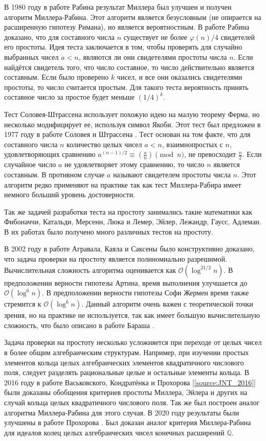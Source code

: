 \documentclass[_dissertation.tex]{subfiles}
\begin{document}
В 1980 году в работе Рабина \cite{Rabin} результат Миллера был улучшен и получен алгоритм Миллера-Рабина.
Этот алгоритм является безусловным (не опирается на расширенную гипотезу Римана), но является вероятностным.
В работе Рабина доказано, что для составного числа $n$ существует не более $\varphi(n)/4$ свидетелей его простоты.
Идея теста заключается в том, чтобы проверять для случайно выбранных чисел $a < n$, являются ли они свидетелями простоты числа $n$.
Если найдётся свидетель того, что число составное, то число действительно является составным.
Если было проверено $k$ чисел, и все они оказались свидетелями простоты, то число считается простым.
Для такого теста вероятность принять составное число за простое будет меньше $(1/4)^{k}$.

Тест Соловея-Штрассена использует похожую идею на малую теорему Ферма, но несколько модифицирует ее, используя символ Якоби.
Этот тест был предложен в 1977 году в работе Соловея и Штрассена \cite{Solovay}.
Тест основан на том факте, что для составного числа $n$ количество целых чисел $a < n$, взаимнопростых с $n$, удовлетворяющих сравнению $a^{{(n-1)/2}}\equiv \left({\frac{a}{n}}\right){\pmod{n}}$, не превосходит $\frac{n}{2}$.
Если случайное число $a$ не удовлетворяет этому сравнению, то число $n$ является составным.
В противном случае $a$ называют свидетелем простоты числа $n$.
Этот алгоритм редко применяют на практике так как тест Миллера-Рабира имеет немного больший уровень достоверности.

Так же задачей разработки теста на простоту занимались такие математики как Фибоначчи, Катальди, Мерсенн, Люка и Лемер, Эйлер, Лежандр, Гаусс, Адлеман.
В их работах было получено много различных тестов на простоту.

В 2002 году в работе Агравала, Каяла и Саксены \cite{AKS} было конструктивно доказано, что задача проверки на простоту является полиномиально разрешимой.
Вычислительная сложность алгоритма оценивается как $\mathcal{O}(\log ^{21/2}n)$.
В предположении верности гипотезы Артина, время выполнения улучшается до $\mathcal{O}(\log ^{6}n)$.
В предположении верности гипотезы Софи Жермен время также стремится к $\mathcal{O}(\log ^{6}n)$.
Данный алгоритм очень важен с теоретической точки зрения, но на практике не используется, так как имеет большую вычислительную сложность, что было описано в работе Бараша \cite{Barash}.

Задача проверки на простоту несколько усложняется при переходе от целых чисел в более общим алгебраическим структурам.
Например, при изучении простых элементов кольца целых алгебраических элементов квадратичного числового поля, следует разделять рациональные целые и остальные элементы кольца.
В 2016 году в работе Васьковского, Кондратёнка и Прохорова [\ref{source:JNT_2016}] были доказаны обобщения критериев простоты Миллера, Эйлера и других на случай кольца целых квадратичного числового поля.
Так же был построен аналог алгоритма Миллера-Рабина для этого случая.
В 2020 году результаты были улучшены в работе Прохорова \cite{source:Prochorov}.
Был доказан аналог критерия Миллера-Рабина для идеалов колец целых алгебраических чисел конечных расширений $\mathbb{Q}$.
\end{document}
